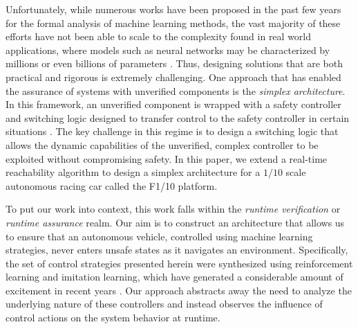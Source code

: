 \documentclass[manuscript,screen,review]{acmart}
\newcommand{\todo}[1]{\textcolor{red}{\textbf{\underline{TODO:}} #1}}
\newcommand{\diego}[1]{\textcolor{purple}{\textbf{\underline{DM:}} #1}}
\begin{document}
Unfortunately, while numerous works have been proposed in the past few years for the formal analysis of machine learning methods, the vast majority of these efforts have not been able to scale to the complexity found in real world applications, where models such as neural networks may be characterized by millions or even billions of parameters \cite{SimonyanVeryDeep}. Thus, designing solutions that are both practical and rigorous is extremely challenging. One approach that has enabled the assurance of systems with unverified components is the \textit{simplex architecture}. In this framework, an unverified component is wrapped with a safety controller and switching logic designed to transfer control to the safety controller in certain situations \cite{Bak2014}. The key challenge in this regime is to design a switching logic that allows the dynamic capabilities of the unverified, complex controller to be exploited without compromising safety. In this paper, we extend a real-time reachability algorithm \cite{Bak2014,Johnson2016} to design a simplex architecture for a $1/10$ scale autonomous racing car called the F1/10 platform. %

 To put our work into context, this work falls within the \textit{runtime verification} or \textit{runtime assurance} realm. Our aim is to construct an architecture that allows us to ensure that an autonomous vehicle, controlled using machine learning strategies, never enters unsafe states as it navigates an environment. Specifically, the set of control strategies presented herein were synthesized using reinforcement learning and imitation learning, which have generated a considerable amount of excitement in recent years \cite{bojarski2016end,lillicrap2015continuous}. Our approach abstracts away the need to analyze the underlying nature of these controllers and instead observes the influence of control actions on the system behavior at runtime. %
\end{document}
